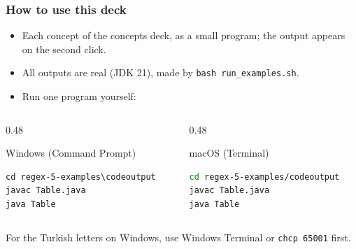\documentclass[aspectratio=169,10pt,compress]{beamer}
\begin{document}
\begin{frame}[t,fragile] \frametitle{How to use this deck}
  \begin{itemize}\small
    \item Each concept of the concepts deck, as a small program; the output appears on the second click.
    \item All outputs are real (JDK 21), made by \texttt{bash run\_examples.sh}.
    \item Run one program yourself:
  \end{itemize}
  \begin{columns}[T]
    \begin{column}{0.48\textwidth}
      \begin{block}{Windows (Command Prompt)}


\begin{lstlisting}[style=codesnippet, language={}, basicstyle=\ttfamily\scriptsize]
cd regex-5-examples\codeoutput
javac Table.java
java Table
\end{lstlisting}


      \end{block}
    \end{column}
    \begin{column}{0.48\textwidth}
      \begin{block}{macOS (Terminal)}


\begin{lstlisting}[style=codesnippet, language=bash, basicstyle=\ttfamily\scriptsize]
cd regex-5-examples/codeoutput
javac Table.java
java Table
\end{lstlisting}


      \end{block}
    \end{column}
  \end{columns}

  \small For the Turkish letters on Windows, use Windows Terminal or \texttt{chcp 65001} first.
\end{frame}

\end{document}
